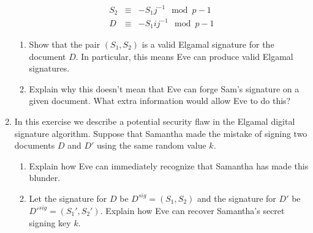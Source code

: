 \documentclass[11pt]{article}
\begin{document}
\begin{enumerate}
{\begin{eqnarray*}
    S_2 &\equiv& -S_1j^{-1}\mod p-1\\
    D &\equiv& -S_1ij^{-1}\mod p-1
  \end{eqnarray*}
  \begin{enumerate}
    \item{
    Show that the pair $(S_1,S_2)$ is a valid Elgamal signature for the document $D$.  In particular, this means Eve can produce valid Elgamal signatures.
    }
    \item{
    Explain why this doesn't mean that Eve can forge Sam's signature on a given document.  What extra information would allow Eve to do this?
    }
  \end{enumerate}
  }
  \item{
  In this exercise we describe a potential security flaw in the Elgamal digital signature algorithm.  Suppose that Samantha made the mistake of signing two documents $D$ and $D'$ using the same random value $k$.
  \begin{enumerate}
    \item{
    Explain how Eve can immediately recognize that Samantha has made this blunder.
    }
    \item{
    Let the signature for $D$ be $D^{sig} = (S_1,S_2)$ and the signature for $D'$ be $D'^{sig} = (S_1',S_2')$.  Explain how Eve can recover Samantha's secret signing key $k$.
    }
  \end{enumerate}
  }
\end{enumerate}
\end{document}

